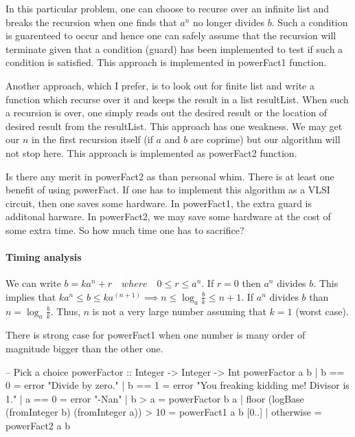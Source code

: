 \documentclass{article}%
\begin{document}
In this particular problem, one can choose to recurse over an infinite
list and breaks the recursion when one finds that $a^n$ no longer
divides $b$. Such a condition is guarenteed to occur and hence one can
safely assume that the recursion will terminate given that a condition
(guard) has been implemented to test if such a condition is satisfied.
This approach is implemented in {\Tt{}powerFact1\nwendquote} function.


Another approach, which I prefer, is to look out for finite list and
write a function which recurse over it and keeps the result in a list
{\Tt{}resultList\nwendquote}. When such a recursion is over, one simply reads out
the desired result or the location of desired result from the
{\Tt{}resultList\nwendquote}. This approach has one weakness. We may get our $n$ in
the first recursion itself (if $a$ and $b$ are coprime) but our
algorithm will not stop here. This approach is implemented as
{\Tt{}powerFact2\nwendquote} function.


Is there any merit in {\Tt{}powerFact2\nwendquote} as than personal whim. There is
at least one benefit of using {\Tt{}powerFact\nwendquote}. If one has to implement
this algorithm as a VLSI circuit, then one saves some hardware. In
{\Tt{}powerFact1\nwendquote}, the extra guard is additonal harware. In
{\Tt{}powerFact2\nwendquote}, we may save some hardware at the cost of some extra
time. So how much time one has to sacrifice?

\paragraph{Timing analysis} We can write $ b = k a^n + r \quad where
\quad 0 \leq r \le a^n $. If $r =0 $ then $a^n$ divides $b$. This
implies that $k a^n \leq b \le k a^(n+1) \implies n \le \log_a
\frac{b}{k} \le n+1 $. If $a^n$ divides $b$ than $ n = \log_a
\frac{b}{k}$. Thus, $n$ is not a very large number assuming that $k=1$
(worst case).

There is strong case for {\Tt{}powerFact1\nwendquote} when one number is many order
of magnitude bigger than the other one.

\nwenddocs{}\endmoddef\nwstartdeflinemarkup\nwenddeflinemarkup

-- Pick a choice
powerFactor :: Integer -> Integer ->  Int
powerFactor a b | b == 0 = error "Divide by zero."
                | b == 1 
                    = error "You freaking kidding me! Divisor is 1."
                | a == 0 = error "-Nan"
                | b > a = powerFactor b a
                | floor (logBase (fromInteger b) (fromInteger a)) >
                10 = powerFact1 a b [0..]
                | otherwise = powerFact2 a b 
\end{document}
